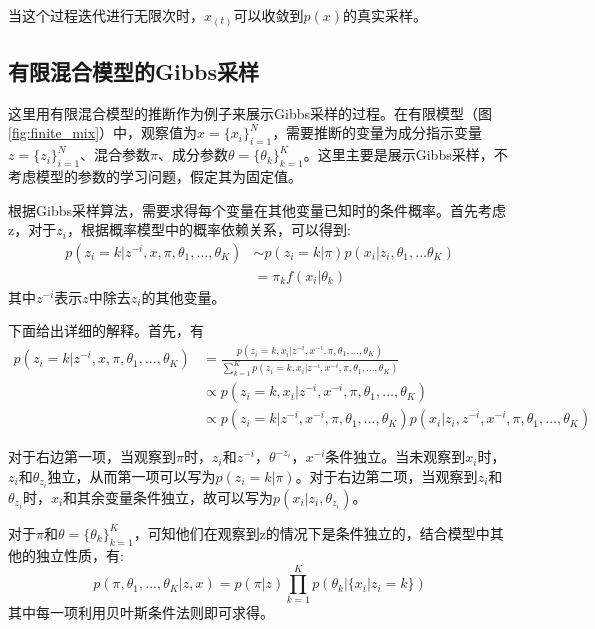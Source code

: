 当这个过程迭代进行无限次时，$x_{(t)}$可以收敛到$p(x)$的真实采样。

\subsection{有限混合模型的Gibbs采样}
这里用有限混合模型的推断作为例子来展示Gibbs采样的过程。在有限模型（图\ref{fig:finite_mix}）中，观察值为$x= {\{x_i\}}_{i=1}^N$，需要推断的变量为成分指示变量$z= {\{z_i\}}_{i=1}^N$、混合参数$\pi$、成分参数$\theta= {\{\theta_k\}}_{k=1}^K$。这里主要是展示Gibbs采样，不考虑模型的参数的学习问题，假定其为固定值。

根据Gibbs采样算法，需要求得每个变量在其他变量已知时的条件概率。首先考虑z，对于$z_i$，根据概率模型中的概率依赖关系，可以得到:
\begin{equation}
\begin{aligned}
p(z_i=k|z^{-i},x,\pi,\theta_1,...,\theta_K) & \sim p(z_i=k|\pi)p(x_i|z_i,\theta_1,...\theta_K)\\
											& = \pi_kf(x_i|\theta_k)
\end{aligned}
\end{equation}
其中$z^{-i}$表示$z$中除去$z_i$的其他变量。

下面给出详细的解释。首先，有
\begin{equation}
\begin{aligned}
p(z_i=k|z^{-i},x,\pi,\theta_1,...,\theta_K) &=  \frac{p(z_i=k,x_i|z^{-i},x^{-i},\pi,\theta_1,...,\theta_K)}{\sum_{k=1}^{K}p(z_i=k,x_i|z^{-i},x^{-i},\pi,\theta_1,...,\theta_K)}\\
											&\propto p(z_i=k,x_i|z^{-i},x^{-i},\pi,\theta_1,...,\theta_K)\\
											&\propto p(z_i=k|z^{-i},x^{-i},\pi,\theta_1,...,\theta_K)p(x_i|z_i,z^{-i},x^{-i},\pi,\theta_1,...,\theta_K)
\end{aligned}
\end{equation}

对于右边第一项，当观察到$\pi$时，$z_i$和$z^{-i}$，$\theta^{-{z_i}}$，$x^{-i}$条件独立。当未观察到$x_i$时，$z_i$和$\theta_{z_i}$独立，从而第一项可以写为$p(z_i=k|\pi)$。对于右边第二项，当观察到$z_i$和$\theta_{z_i}$时，$x_i$和其余变量条件独立，故可以写为$p(x_i|z_i,\theta_{z_i})$。

对于$\pi$和$\theta= {\{\theta_k\}}_{k=1}^K$，可知他们在观察到z的情况下是条件独立的，结合模型中其他的独立性质，有:
\begin{equation}
p(\pi,\theta_1,...,\theta_K|z,x) = p(\pi|z)\prod_{k=1}^K{p(\theta_k|\{x_i|z_i=k\})}
\end{equation}
其中每一项利用贝叶斯条件法则即可求得。

